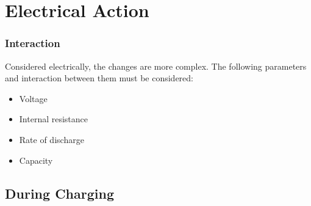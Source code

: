 \documentclass{beamer}
\begin{document}
\section{Electrical Action}

{ %
    \begin{frame}[plain]
     \end{frame}
}

 \begin{frame}   %
    \frametitle{Interaction}
    \fontsize{9pt}{14}\selectfont
    
    \bigskip
    Considered electrically, the changes are more complex. The following parameters and interaction between them must be considered:
    \bigskip
    
    \begin{itemize}
      \item Voltage
      \item Internal resistance
      \item Rate of discharge
      \item Capacity
    \end{itemize}
  \end{frame}

\subsection{During Charging}
\end{document}
